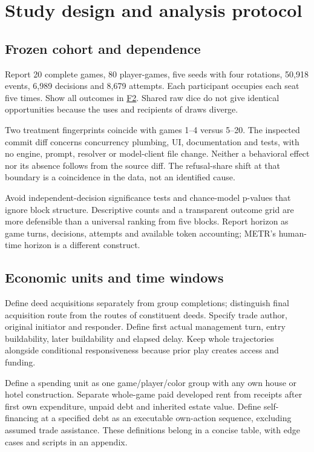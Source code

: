 \section{Study design and analysis protocol}
\subsection{Frozen cohort and dependence}
Report 20 complete games, 80 player-games, five seeds with four rotations, 50,918 events, 6,989 decisions and 8,679 attempts. Each participant occupies each seat five times. Show all outcomes in \href{run:../astra/exhibits/f02_seed_rotation_winners.png}{F2}. Shared raw dice do not give identical opportunities because the uses and recipients of draws diverge.

Two treatment fingerprints coincide with games 1--4 versus 5--20. The inspected commit diff concerns concurrency plumbing, UI, documentation and tests, with no engine, prompt, resolver or model-client file change. Neither a behavioral effect nor its absence follows from the source diff. The refusal-share shift at that boundary is a coincidence in the data, not an identified cause.

Avoid independent-decision significance tests and chance-model p-values that ignore block structure. Descriptive counts and a transparent outcome grid are more defensible than a universal ranking from five blocks. Report horizon as game turns, decisions, attempts and available token accounting; METR's human-time horizon is a different construct.

\subsection{Economic units and time windows}
Define deed acquisitions separately from group completions; distinguish final acquisition route from the routes of constituent deeds. Specify trade author, original initiator and responder. Define first actual management turn, entry buildability, later buildability and elapsed delay. Keep whole trajectories alongside conditional responsiveness because prior play creates access and funding.

Define a spending unit as one game/player/color group with any own house or hotel construction. Separate whole-game paid developed rent from receipts after first own expenditure, unpaid debt and inherited estate value. Define self-financing at a specified debt as an executable own-action sequence, excluding assumed trade assistance. These definitions belong in a concise table, with edge cases and scripts in an appendix.

